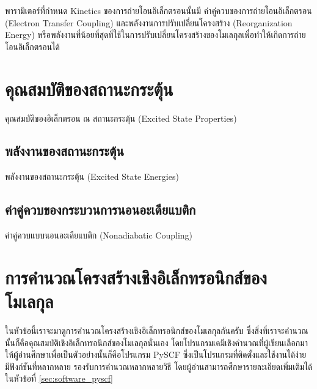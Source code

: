 พารามิเตอร์ที่กำหนด Kinetics ของการถ่ายโอนอิเล็กตรอนนั้นมี ค่าคู่ควบของการถ่ายโอนอิเล็กตรอน (Electron Transfer Coupling) และพลังงานการปรับเปลี่ยนโครงสร้าง (Reorganization Energy) หรือพลังงานที่น้อยที่สุดที่ใช้ในการปรับเปลี่ยนโครงสร้างของโมเลกุลเพื่อทำให้เกิดการถ่ายโอนอิเล็กตรอนได้

\section{คุณสมบัติของสถานะกระตุ้น}
\label{sec:ex_prop}

คุณสมบัติของอิเล็กตรอน ณ สถานะกระตุ้น (Excited State Properties)

\subsection{พลังงานของสถานะกระตุ้น}
\label{ssec:ex_ener}

พลังงานของสถานะกระตุ้น (Excited State Energies)

\subsection{ค่าคู่ควบของกระบวนการนอนอะเดียแบติก}
\label{ssec:nonadia_ener}

ค่าคู่ควบแบบนอนอะเดียแบติก (Nonadiabatic Coupling)

\section{การคำนวณโครงสร้างเชิงอิเล็กทรอนิกส์ของโมเลกุล}
\label{sec:comp_elec_strct}

ในหัวข้อนี้เราจะมาดูการคำนวณโครงสร้างเชิงอิเล็กทรอนิกส์ของโมเลกุลกันครับ ซึ่งสิ่งที่เราจะคำนวณนั้นก็คือคุณสมบัติเชิงอิเล็กทรอนิกส์ของโมเลกุลนั่นเอง โดยโปรแกรมเคมีเชิงคำนวณที่ผู้เขียนเลือกมาให้ผู้อ่านศึกษาเพื่อเป็นตัวอย่างนั้นก็คือโปรแกรม PySCF ซึ่งเป็นโปรแกรมที่ติดตั้งและใช้งานได้ง่าย มีฟังก์ชันที่หลากหลาย รองรับการคำนวณหลากหลายวิธี โดยผู้อ่านสามารถศึกษารายละเอียดเพิ่มเติมได้ในหัวข้อที่ \ref{sec:software_pyscf}


